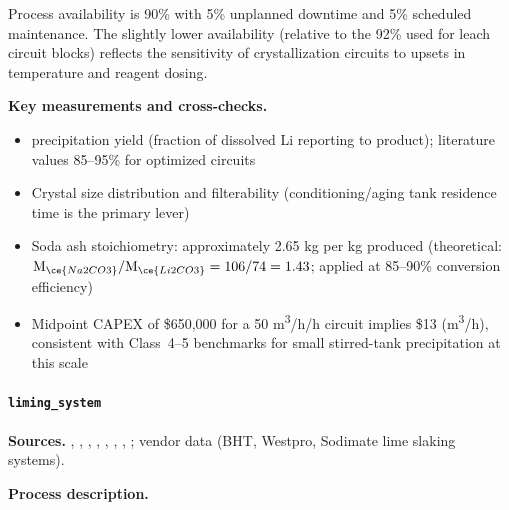 Process availability is 90\% with 5\% unplanned downtime and 5\% scheduled maintenance. The slightly lower availability (relative to the 92\% used for leach circuit blocks) reflects the sensitivity of crystallization circuits to upsets in temperature and reagent dosing.

\medskip
\noindent\textbf{Key measurements and cross-checks.}\quad
\begin{itemize}[noitemsep]
    \item {} precipitation yield (fraction of dissolved Li reporting to product); literature values 85--95\% for optimized circuits \cite{liuProcessAnalysisStudy2021, battagliaRecoveryLithiumCarbonate2022}
    \item Crystal size distribution and filterability (conditioning/aging tank residence time is the primary lever)
    \item Soda ash stoichiometry: approximately 2.65 kg  per kg  produced (theoretical: $\text{M}_{\ce{Na2CO3}} / \text{M}_{\ce{Li2CO3}} = 106/74 = 1.43$; applied at 85--90\% conversion efficiency)
    \item Midpoint CAPEX of \$650,000 for a 50 \si{m^3/h}/h circuit implies \$13 (\si{m^3/h}), consistent with Class~4--5 benchmarks for small stirred-tank precipitation at this scale
\end{itemize}

\clearpage
\paragraph{\texttt{liming\_system}}\label{app:04-methods-blockdefs-limingsystem}

\medskip
\noindent\textbf{Sources.}\quad
\citet{battagliaRecoveryLithiumCarbonate2022}, \citet{liuProcessAnalysisStudy2021}, \citet{khakmardanLifeCycleAssessment2024}, \citet{iyerLifecycleAnalysisLithium2024}, \citet{royLithiumClayAssessing2024}, \citet{sgscanadaincSK1300Technical2024}, \citet{ausimmMonograph27Cost}, \citet{petersPlantDesignEconomics1991}; vendor data (BHT, Westpro, Sodimate lime slaking systems). 

\medskip
\noindent\textbf{Process description.}\quad

